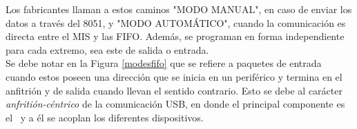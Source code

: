 	Los fabricantes llaman a estos caminos "MODO MANUAL", en caso de enviar los datos a través del 8051, y "MODO AUTOMÁTICO", cuando la comunicación es directa entre el MIS y las FIFO. Además, se programan en forma independiente para cada extremo, sea este de salida o entrada.\\
	
	Se debe notar en la Figura \ref{modesfifo} que se refiere a paquetes de entrada cuando estos poseen una dirección que se inicia en un periférico y termina en el anfitrión y de salida cuando llevan el sentido contrario. Esto se debe al carácter {\it anfritión-céntrico} de la comunicación USB, en donde el principal componente es el \host\ y a él se acoplan los diferentes dispositivos.\\
	
	